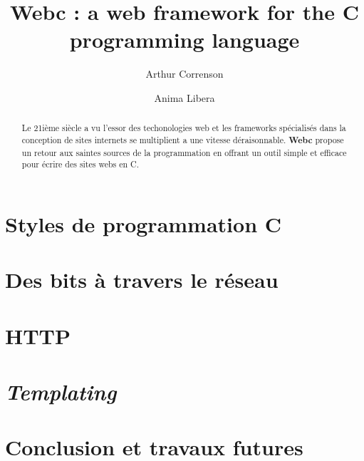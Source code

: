 \documentclass[french, twocolumn]{article}
\begin{document}
    \title{Webc : a web framework for the C programming language}
    \author{Arthur Correnson \and Anima Libera}
    \maketitle
    \begin{abstract}
        Le 21ième siècle a vu l'essor des techonologies web et les frameworks spécialisés dans la conception de sites internets se multiplient a une vitesse déraisonnable. \textbf{Webc} propose un retour aux saintes sources de la programmation en offrant un outil simple et efficace pour écrire des sites webs en C.
    \end{abstract}
    \section{Styles de programmation C}
    \section{Des bits à travers le réseau}
    \section{HTTP}
    \section{\textit{Templating}}
    \section{Conclusion et travaux futures}
\end{document}
